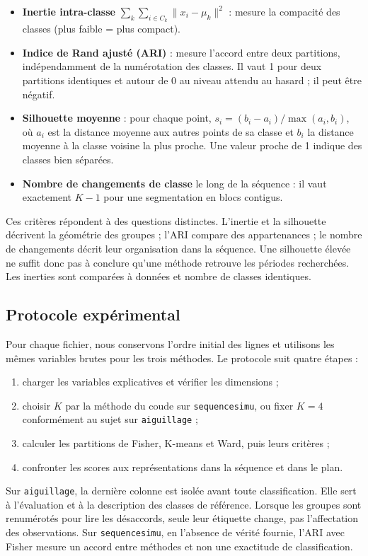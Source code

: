 \documentclass[10pt,a4paper]{article}
\begin{document}
\begin{itemize}
  \item \textbf{Inertie intra-classe} $\sum_k \sum_{i\in C_k}\lVert x_i-\mu_k\rVert^2$ :
        mesure la compacité des classes (plus faible = plus compact).
  \item \textbf{Indice de Rand ajusté (ARI)} : mesure l'accord entre deux partitions,
        indépendamment de la numérotation des classes. Il vaut 1 pour deux
        partitions identiques et autour de 0 au niveau attendu au hasard ; il peut être négatif.
  \item \textbf{Silhouette moyenne} : pour chaque point,
        $s_i = (b_i - a_i)/\max(a_i,b_i)$, où $a_i$ est la distance moyenne aux
        autres points de sa classe et $b_i$ la distance moyenne à la classe voisine la plus
        proche. Une valeur proche de 1 indique des classes bien séparées.
  \item \textbf{Nombre de changements de classe} le long de la séquence : il vaut
        exactement $K-1$ pour une segmentation en blocs contigus.
\end{itemize}

Ces critères répondent à des questions distinctes. L'inertie et la silhouette
décrivent la géométrie des groupes ; l'ARI compare des appartenances ; le nombre
de changements décrit leur organisation dans la séquence. Une silhouette élevée
ne suffit donc pas à conclure qu'une méthode retrouve les périodes recherchées.
Les inerties sont comparées à données et nombre de classes identiques.

\subsection{Protocole expérimental}
Pour chaque fichier, nous conservons l'ordre initial des lignes et utilisons les
mêmes variables brutes pour les trois méthodes. Le protocole suit quatre étapes :
\begin{enumerate}
 \item charger les variables explicatives et vérifier les dimensions ;
 \item choisir $K$ par la méthode du coude sur \texttt{sequencesimu}, ou fixer
       $K=4$ conformément au sujet sur \texttt{aiguillage} ;
 \item calculer les partitions de Fisher, K-means et Ward, puis leurs critères ;
 \item confronter les scores aux représentations dans la séquence et dans le plan.
\end{enumerate}
Sur \texttt{aiguillage}, la dernière colonne est isolée avant toute classification.
Elle sert à l'évaluation et à la description des classes de référence. Lorsque
les groupes sont renumérotés pour lire les désaccords, seule leur étiquette change,
pas l'affectation des observations. Sur \texttt{sequencesimu}, en l'absence de
vérité fournie, l'ARI avec Fisher mesure un accord entre méthodes et non une
exactitude de classification.
\end{document}
